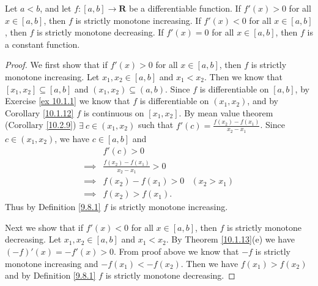 \begin{proposition}\label{10.3.3}
    Let \(a < b\), and let \(f : [a, b] \to \mathbf{R}\) be a differentiable function.
    If \(f'(x) > 0\) for all \(x \in [a, b]\), then \(f\) is strictly monotone increasing.
    If \(f'(x) < 0\) for all \(x \in [a, b]\), then \(f\) is strictly monotone decreasing.
    If \(f'(x) = 0\) for all \(x \in [a, b]\), then \(f\) is a constant function.
\end{proposition}

\begin{proof}
    We first show that if \(f'(x) > 0\) for all \(x \in [a, b]\), then \(f\) is strictly monotone increasing.
    Let \(x_1, x_2 \in [a, b]\) and \(x_1 < x_2\).
    Then we know that \([x_1, x_2] \subseteq [a, b]\) and \((x_1, x_2) \subseteq (a, b)\).
    Since \(f\) is differentiable on \([a, b]\), by Exercise \ref{ex 10.1.1} we know that \(f\) is differentiable on \((x_1, x_2)\), and by Corollary \ref{10.1.12} \(f\) is continuous on \([x_1, x_2]\).
    By mean value theorem (Corollary \ref{10.2.9}) \(\exists\ c \in (x_1, x_2)\) such that \(f'(c) = \frac{f(x_2) - f(x_1)}{x_2 - x_1}\).
    Since \(c \in (x_1, x_2)\), we have \(c \in [a, b]\) and
    \begin{align*}
                 & f'(c) > 0                                           \\
        \implies & \frac{f(x_2) - f(x_1)}{x_2 - x_1} > 0               \\
        \implies & f(x_2) - f(x_1) > 0                   & (x_2 > x_1) \\
        \implies & f(x_2) > f(x_1).
    \end{align*}
    Thus by Definition \ref{9.8.1} \(f\) is strictly monotone increasing.

    Next we show that if \(f'(x) < 0\) for all \(x \in [a, b]\), then \(f\) is strictly monotone decreasing.
    Let \(x_1, x_2 \in [a, b]\) and \(x_1 < x_2\).
    By Theorem \ref{10.1.13}(e) we have \((-f)'(x) = -f'(x) > 0\).
    From proof above we know that \(-f\) is strictly monotone increasing and \(-f(x_1) < -f(x_2)\).
    Then we have \(f(x_1) > f(x_2)\) and by Definition \ref{9.8.1} \(f\) is strictly monotone decreasing.


\end{proof}
